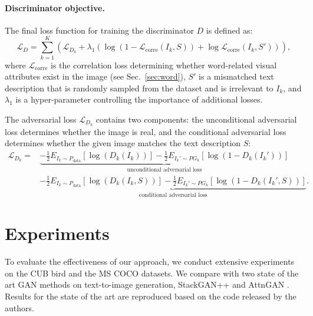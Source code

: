 \documentclass{article}
\begin{document}
\paragraph{Discriminator objective.} The final loss function for training the discriminator $D$ is defined as:
\begin{equation}
\mathcal{L}_{D}=\sum _{k=1}^{K}(\mathcal{L}_{D_{k}} + \lambda_{1}(\log(1-\mathcal{L}_\text{corre}(I_{k},S))+ \log\mathcal{L}_\text{corre}(I_{k},{S}')))
\textrm{,}
\end{equation}
where $\mathcal{L}_\text{corre}$ is the correlation loss determining whether word-related visual attributes exist in the image (see Sec.~\ref{sec:word}), $S'$ is a mismatched text description that is randomly sampled from the dataset and is irrelevant to $I_{k}$, and $\lambda_{1}$ is a hyper-parameter controlling the importance of additional losses.

The adversarial loss $\mathcal{L}_{D_k}$ contains two components: the unconditional adversarial loss determines whether the image is real, and the conditional adversarial loss determines whether the given image matches the text description $S$:
\begin{equation}
\begin{split}
\mathcal{L}_{D_{k}}=&\underbrace{-\frac{1}{2}E_{I_{k}\sim P_\text{data}}\left [\log(D_{k}(I_{k})) \right ]-\frac{1}{2}E_{{I_{k}}'\sim PG_{k}}\left [ \log(1-D_{k}({I_{k}}')) \right ]}_\text{unconditional adversarial loss}\\
&\underbrace{-\frac{1}{2}E_{I_{k}\sim P_\text{data}}\left [ \log(D_{k}(I_{k},S)) \right ]-\frac{1}{2}E_{{I_{k}}'\sim PG_{k}}\left [\log(1-D_{k}({I_{k}}',S)) \right ]}_\text{conditional adversarial loss}
\textrm{.}
\end{split}
\label{eq:discriminatorlss}
\end{equation}

\section{Experiments}
\label{experiments}

To evaluate the effectiveness of our approach, we conduct extensive experiments on the CUB bird \citep{wah2011caltech} and the MS COCO \citep{lin2014microsoft} datasets.
We compare with two state of the art GAN methods on text-to-image generation, StackGAN++ \cite{zhang2018stackgan++} and AttnGAN \cite{xu2018attngan}.
Results for the state of the art are reproduced based on the code released by the authors.
\end{document}
